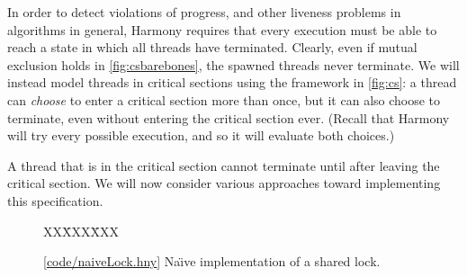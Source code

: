\documentclass{report}
\newcommand{\harmonysource}[1]{
\begin{tabbing}
XX\=XXX\=XXX\kill
    
\end{tabbing}
}
\newcommand{\harmonylink}[1]{%
[\href{https://harmony.cs.cornell.edu/#1}{\underline{#1}}]%
}
\newenvironment{code}{
\tcolorbox
}{
\endtcolorbox
}
\begin{document}
In order to detect violations of progress, and other liveness problems in
algorithms in general, Harmony requires that every execution must be
able to reach a state in which all threads have terminated.
Clearly, even if mutual exclusion holds in \autoref{fig:csbarebones},
the spawned threads never terminate.  We
will instead model threads in critical sections using the framework in
\autoref{fig:cs}: a thread can \emph{choose} to enter a
critical section more than once, but it can also choose to terminate, even
without entering the critical section ever.
(Recall that Harmony will try every possible execution, and so it will evaluate
both choices.)

A thread that is in the critical
section cannot terminate until after leaving the critical section.
We will now consider various approaches toward implementing this
specification.

\begin{figure}
\begin{code}
\harmonysource{naiveLock}
\end{code}
\caption{\harmonylink{code/naiveLock.hny} Na\"{\i}ve implementation of a shared lock.}
\label{fig:naivelock}
\end{figure}
\end{document}
